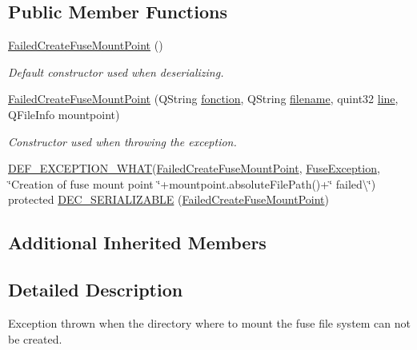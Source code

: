 \subsection*{Public Member Functions}
\begin{DoxyCompactItemize}
\item 
\hyperlink{class_gost_crypt_1_1_fuse_driver_1_1_failed_create_fuse_mount_point_acd5ffd2422444ef265a7a6e6f922c340}{Failed\+Create\+Fuse\+Mount\+Point} ()
\begin{DoxyCompactList}\small\item\em Default constructor used when deserializing. \end{DoxyCompactList}\item 
\hyperlink{class_gost_crypt_1_1_fuse_driver_1_1_failed_create_fuse_mount_point_ae8814cdedaff4174d13d11ba4ddf4704}{Failed\+Create\+Fuse\+Mount\+Point} (Q\+String \hyperlink{class_gost_crypt_1_1_gost_crypt_exception_a29b8c93d5efbb1ff369107385725a939}{fonction}, Q\+String \hyperlink{class_gost_crypt_1_1_gost_crypt_exception_a749a12375f4ba9d502623b99d8252f38}{filename}, quint32 \hyperlink{class_gost_crypt_1_1_gost_crypt_exception_abf506d911f12a4e969eea500f90bd32c}{line}, Q\+File\+Info mountpoint)
\begin{DoxyCompactList}\small\item\em Constructor used when throwing the exception. \end{DoxyCompactList}\item 
\hyperlink{_gost_crypt_exception_8h_a5bc1e1c6c9d6f46c84eeba49e33355f9}{D\+E\+F\+\_\+\+E\+X\+C\+E\+P\+T\+I\+O\+N\+\_\+\+W\+H\+AT}(\hyperlink{class_gost_crypt_1_1_fuse_driver_1_1_failed_create_fuse_mount_point}{Failed\+Create\+Fuse\+Mount\+Point}, \hyperlink{class_gost_crypt_1_1_fuse_driver_1_1_fuse_exception}{Fuse\+Exception}, \char`\"{}Creation of fuse mount point \char`\"{}+mountpoint.\+absolute\+File\+Path()+\char`\"{} failed\textbackslash{}\char`\"{}) protected \hyperlink{class_gost_crypt_1_1_fuse_driver_1_1_failed_create_fuse_mount_point_ab54cc83a4929ce61b9976e0bef285c58}{D\+E\+C\+\_\+\+S\+E\+R\+I\+A\+L\+I\+Z\+A\+B\+LE} (\hyperlink{class_gost_crypt_1_1_fuse_driver_1_1_failed_create_fuse_mount_point}{Failed\+Create\+Fuse\+Mount\+Point})
\end{DoxyCompactItemize}
\subsection*{Additional Inherited Members}


\subsection{Detailed Description}
Exception thrown when the directory where to mount the fuse file system can not be created. 

